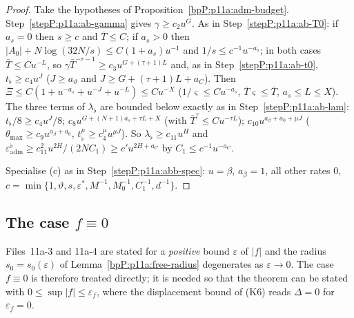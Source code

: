 \begin{proof}
\label{stepP:p11a:qb-poly} Take the hypotheses of Proposition~\ref{bpP:p11a:adm-budget}. Step~\ref{stepP:p11a:ab-gamma} gives $\gamma\ge c_2u^G$. As in Step~\ref{stepP:p11a:ab-T0}: if $a_s=0$ then $s\ge c$ and $\bar T\le C$; if $a_s>0$ then $\lvert A_0\rvert+N\log(32N/s)\le C(1+a_s)u^{-1}$ and $1/s\le c^{-1}u^{-a_s}$; in both cases $\bar T\le Cu^{-L}$, so $\gamma\bar T^{-\tau-1}\ge c_3u^{G+(\tau+1)L}$ and, as in Step~\ref{stepP:p11a:ab-t0}, $t_\flat\ge c_4u^J$ ($J\ge a_\vartheta$ and $J\ge G+(\tau+1)L+a_C$). Then $\bar\Xi\le C(1+u^{-a_s}+u^{-J}+u^{-L})\le Cu^{-X}$ ($1/\varsigma\le Cu^{-a_s}$, $\bar T\varsigma\le\bar T$, $a_s\le L\le X$). The three terms of $\lambda_\flat$ are bounded below exactly as in Step~\ref{stepP:p11a:ab-lam}: $t_\flat/8\ge c_4u^J/8$; $c_8u^{G+(N+1)a_s+\tau L+X}$ (with $\bar T^\tau\le Cu^{-\tau L}$); $c_{10}u^{a_\beta+a_0+\mu J}$ ($\theta_{\max}\ge c_9u^{a_\beta+a_0}$, $t_\flat^\mu\ge c_4^\mu u^{\mu J}$). So $\lambda_\flat\ge c_{11}u^H$ and $\varepsilon^\flat_{\mathrm{adm}}\ge c_{11}^2u^{2H}/(2NC_1)\ge c'u^{2H+a_C}$ by $C_1\le c^{-1}u^{-a_C}$.

\label{stepP:p11a:qb-beta} Specialise (c) as in Step~\ref{stepP:p11a:abb-spec}: $u=\beta$, $a_\beta=1$, all other rates $0$, $c=\min\{1,\vartheta,s,\varepsilon^*,M^{-1},M_0^{-1},C_1^{-1},d^{-1}\}$.
\end{proof}

\subsection{The case $f\equiv0$}\label{bpP:p11a:sec-q-zero}

Files~11a-3 and 11a-4 are stated for a \emph{positive} bound $\varepsilon$ of $\lvert f\rvert$ and the radius $s_0=s_0(\varepsilon)$ of Lemma~\ref{bpP:p11a:free-radius} degenerates as $\varepsilon\to0$. The case $f\equiv0$ is therefore treated directly; it is needed so that the theorem can be stated with $0\le\sup\lvert f\rvert\le\varepsilon_f$, where the displacement bound of (K6) reads $\Delta=0$ for $\varepsilon_f=0$.

